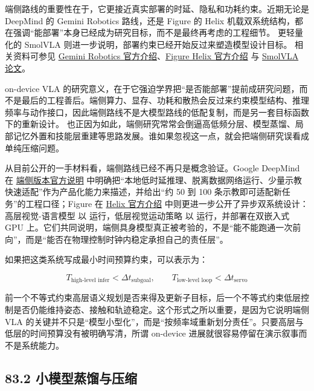 端侧路线的重要性在于，它更接近真实部署的时延、隐私和功耗约束。近期无论是 DeepMind 的 Gemini Robotics 路线，还是 Figure 的 Helix 机载双系统结构，都在强调“能部署”本身已经成为研究目标，而不是最终再考虑的工程细节。 更轻量化的 SmolVLA 则进一步说明，部署约束已经开始反过来塑造模型设计目标。 相关资料可参见 \href{https://deepmind.google/blog/gemini-robotics-brings-ai-into-the-physical-world/}{Gemini Robotics 官方介绍}、\href{https://www.figure.ai/news/helix}{Figure Helix 官方介绍} 与 \href{https://arxiv.org/abs/2506.01844}{SmolVLA 论文}。

on-device VLA 的研究意义，在于它强迫学界把“是否能部署”提前成研究问题，而不是最后的工程善后。端侧算力、显存、功耗和散热会反过来约束模型结构、推理频率与动作接口，因此端侧路线不是大模型路线的低配复制，而是另一套目标函数下的重新设计。 也正因为如此，端侧研究常常会倒逼高低频分层、模型蒸馏、局部记忆外置和技能层重建等思路发展。谁如果忽视这一点，就会把端侧研究误看成单纯压缩问题。

从目前公开的一手材料看，端侧路线已经不再只是概念验证。Google DeepMind 在 \href{https://deepmind.google/blog/gemini-robotics-on-device-brings-ai-to-local-robotic-devices/}{端侧版本官方说明} 中明确把“本地低时延推理、脱离数据网络运行、少量示教快速适配”作为产品化能力来描述，并给出“约 50 到 100 条示教即可适配新任务”的工程口径；Figure 在 \href{https://www.figure.ai/news/helix}{Helix 官方介绍} 中则更进一步公开了异步双系统设计：高层视觉-语言模型 \texttt{} 以 \texttt{} 运行，低层视觉运动策略 \texttt{} 以 \texttt{} 运行，并部署在双嵌入式 GPU 上。它们共同说明，端侧具身模型真正被考验的，不是“能不能跑通一次前向”，而是“能否在物理控制时钟内稳定承担自己的责任层”。

如果把这类系统写成最小时间预算约束，可以表示为：

\begingroup
\scriptsize
\begin{equation*}
T_{\text{high-level infer}} < \Delta t_{\text{subgoal}}, \qquad
T_{\text{low-level loop}} < \Delta t_{\text{servo}}
\end{equation*}
\endgroup

前一个不等式约束高层语义规划是否来得及更新子目标，后一个不等式约束低层控制是否仍能维持姿态、接触和轨迹稳定。这个形式之所以重要，是因为它说明端侧 VLA 的关键并不只是“模型小型化”，而是“按频率域重新划分责任”。只要高层与低层的时间预算没有被明确写清，所谓 on-device 进展就很容易停留在演示叙事而不是系统能力。

\subsection*{83.2 小模型蒸馏与压缩}


